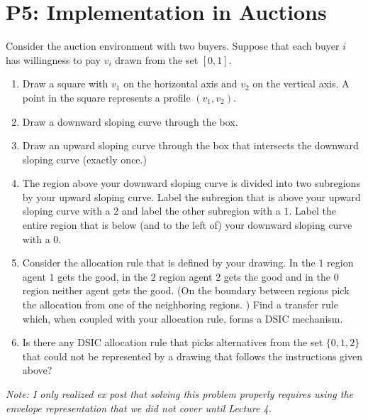\documentclass{article}
\newcommand{\enterProblemHeader}[1]{
\nobreak\extramarks{#1}{#1 continued on next page\ldots}\nobreak
\nobreak\extramarks{#1 (continued)}{#1 continued on next page\ldots}\nobreak
}
\newcommand{\exitProblemHeader}[1]{
\nobreak\extramarks{#1 (continued)}{#1 continued on next page\ldots}\nobreak
\nobreak\extramarks{#1}{}\nobreak
}
\newcounter{homeworkProblemCounter} %
\newcommand{\homeworkProblemName}{}
\newenvironment{ex}[1][Problem \arabic{homeworkProblemCounter}]{ %
\stepcounter{homeworkProblemCounter} %
\renewcommand{\homeworkProblemName}{#1} %
\section{\homeworkProblemName} %
}{
}
\newif\ifsolutions
\begin{document}
\begin{ex}[P5: Implementation in Auctions]
	Consider the auction environment with two buyers.  Suppose that each buyer $i$ has willingness to pay
	$v_i$ drawn from the set $[0,1].$
	\begin{enumerate}
		\item Draw a square with $v_1$ on the horizontal axis and $v_2$ on the vertical axis.  A point in the square
		represents a profile $(v_1, v_2)$.
		\item Draw a downward sloping curve through the box.
		\item Draw an upward sloping curve through the box that intersects the downward sloping curve (exactly once.)
		\item The region above your downward sloping curve is divided into two subregions by your upward sloping curve.  Label
		the subregion that is above your upward sloping curve with a $2$ and label the other subregion with a $1$.  Label
		the entire region that is below (and to the left of) your downward sloping curve with a $0$.
		\item Consider the allocation rule that is defined by your drawing.  In the $1$ region agent $1$ gets the
		good, in the $2$ region agent $2$ gets the good and in the $0$ region neither agent gets the good.  (On the boundary
		between regions pick the allocation from one of the neighboring regions. )  Find a transfer rule which, when
		coupled with your allocation rule, forms a DSIC mechanism.
		\item Is there any DSIC allocation rule that picks alternatives from the set $\{0,1,2\}$ that could not be represented
		by a drawing that follows the instructions given above?
	\end{enumerate}

	\emph{Note: I only realized ex post that solving this problem properly requires using the envelope representation that we did not cover until Lecture 4.}
	
	
	\ifsolutions

\end{ex}
\end{document}
